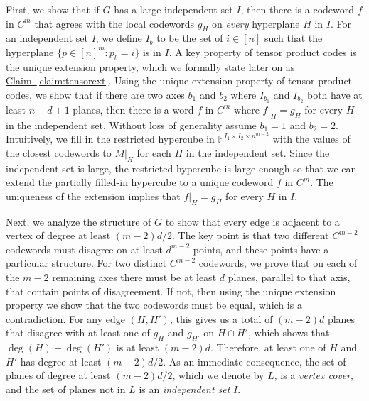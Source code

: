 \documentclass[11pt]{article}
\numberwithin{equation}{section}
\theoremstyle{definition}
\theoremstyle{plain}
\newcommand{\expref}[2]{\hyperref[#2]{#1~\ref{#2}}}
\theoremstyle{plain}
\newcommand{\colored}{}
\newcommand{\plane}{{\colored{H}}} %
\newcommand{\otherplane}{\colored{ {H'}}} %
\newcommand{\codedist}{\colored{d}} %
\newcommand{\blocklength}{\colored{n}} %
\newcommand{\testerinput}{\colored{M}} %
\newcommand{\closestlocalword}[1]{ \colored{g_{#1}}} %
\newcommand{\closestglobalword}{\colored{f}} %
\newcommand{\Field}{\colored{\mathbb F}}
\begin{document}
First, we show that if $G$ has a large independent set $I$, then there is a codeword $\closestglobalword$ in $C^{m}$ that agrees with the local codewords $\closestlocalword{\plane}$ on \emph{every} hyperplane $\plane$ in $I$. For an independent set $I$, we define $I_b$ to be the set of $i \in [\blocklength]$ such that the hyperplane $\{p \in [\blocklength]^m : p_b = i\}$ is in $I$. A key property of tensor product codes is the unique extension property, which we formally state later on as \expref{Claim}{claim:tensorext}. Using the unique extension property of tensor product codes, we show that if there are two axes $b_1$ and $b_2$ where $I_{b_1}$ and $I_{b_2}$ both have at least $\blocklength - \codedist + 1$ planes, then there is a word $\closestglobalword$ in $C^m$ where $\closestglobalword \vert_{\plane} = \closestlocalword{\plane}$ for every $\plane$ in the independent set. Without loss of generality assume $b_1 = 1$ and $b_2 = 2$. Intuitively, we fill in the restricted hypercube in $\Field^{I_1 \times I_2 \times \blocklength^{m-2}}$ with the values of the closest codewords to $\testerinput \vert_{\plane}$ for each $\plane$ in the independent set. Since the independent set is large, the restricted hypercube is large enough so that we can extend the partially filled-in hypercube to a unique codeword $\closestglobalword$ in $C^m$. The uniqueness of the extension implies that $\closestglobalword \vert_{\plane} = \closestlocalword{\plane}$ for every $\plane$ in $I$.

Next, we analyze the structure of $G$ to show that every edge is adjacent to a vertex of degree at least $(m-2)\codedist/2$. The key point is that two different $C^{m-2}$ codewords must disagree on at least $\codedist^{m-2}$ points, and these points have a particular structure. For two distinct $C^{m-2}$ codewords, we prove that on each of the $m-2$ remaining axes there must be at least $\codedist$ planes, parallel to that axis, that contain points of disagreement. If not, then using the unique extension property we show that the two codewords must be equal, which is a contradiction. For any edge $(\plane, \otherplane)$, this gives us a total of $(m-2)\codedist$ planes that disagree with at least one of $\closestlocalword{\plane}$ and $\closestlocalword{\otherplane}$ on $\plane \cap \otherplane$, which shows that $\deg(\plane) + \deg(\otherplane)$ is at least $(m-2)\codedist$. Therefore, at least one of $\plane$ and $\otherplane$ has degree at least $(m-2)\codedist/2$. As an immediate consequence,
%
the set of planes of degree                                                         %
at least $(m-2)\codedist/2$, which we denote by $L$, is a \emph{vertex cover}, and the set of planes not in $L$ is an \emph{independent set} $I$.
\end{document}
